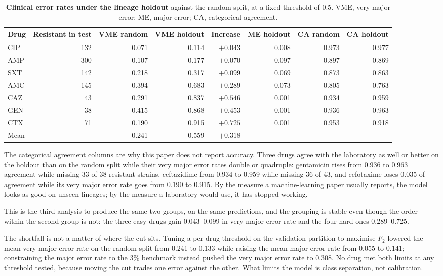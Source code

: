 \begin{table}[t]\centering\footnotesize
\setlength{\tabcolsep}{4pt}
\caption{\textbf{Clinical error rates under the lineage holdout} against the random split, at a
fixed threshold of 0.5. VME, very major error; ME, major error; CA, categorical agreement.}
\label{tab:holdoutclin}
\begin{tabular}{lrrrrrrr}
\toprule
Drug & Resistant in test & VME random & VME holdout & Increase & ME holdout & CA random & CA holdout \\
\midrule
CIP & 132 & 0.071 & 0.114 & $+0.043$ & 0.008 & 0.973 & 0.977 \\
AMP & 300 & 0.107 & 0.177 & $+0.070$ & 0.097 & 0.897 & 0.869 \\
SXT & 142 & 0.218 & 0.317 & $+0.099$ & 0.069 & 0.873 & 0.863 \\
\midrule
AMC & 145 & 0.394 & 0.683 & $+0.289$ & 0.073 & 0.805 & 0.763 \\
CAZ & 43 & 0.291 & 0.837 & $+0.546$ & 0.001 & 0.934 & 0.959 \\
GEN & 38 & 0.415 & 0.868 & $+0.453$ & 0.001 & 0.936 & 0.963 \\
CTX & 71 & 0.190 & 0.915 & $+0.725$ & 0.001 & 0.953 & 0.918 \\
\midrule
Mean & --- & 0.241 & 0.559 & $+0.318$ & --- & --- & --- \\
\bottomrule
\end{tabular}
\end{table}

The categorical agreement columns are why this paper does not report accuracy. Three drugs agree
with the laboratory as well or better on the holdout than on the random split while their very major
error rates double or quadruple: gentamicin rises from 0.936 to 0.963 agreement while missing 33 of
38 resistant strains, ceftazidime from 0.934 to 0.959 while missing 36 of 43, and cefotaxime loses
0.035 of agreement while its very major error rate goes from 0.190 to 0.915. By the measure a
machine-learning paper usually reports, the model looks as good on unseen lineages; by the measure a
laboratory would use, it has stopped working.

This is the third analysis to produce the same two groups, on the same predictions, and the
grouping is stable even though the order within the second group is not: the three easy drugs gain
0.043--0.099 in very major error rate and the four hard ones 0.289--0.725.

The shortfall is not a matter of where the cut sits. Tuning a per-drug threshold on the validation
partition to maximise $F_2$ lowered the mean very major error rate on the random split from 0.241 to
0.133 while raising the mean major error rate from 0.055 to 0.141; constraining the major error rate
to the 3\% benchmark instead pushed the very major error rate to 0.308. No drug met both limits at
any threshold tested, because moving the cut trades one error against the other. What limits the
model is class separation, not calibration.


